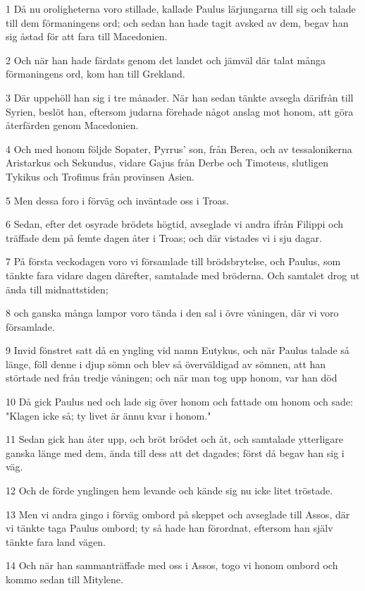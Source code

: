 \par 1 Då nu oroligheterna voro stillade, kallade Paulus lärjungarna till sig och talade till dem förmaningens ord; och sedan han hade tagit avsked av dem, begav han sig åstad för att fara till Macedonien.
\par 2 Och när han hade färdats genom det landet och jämväl där talat många förmaningens ord, kom han till Grekland.
\par 3 Där uppehöll han sig i tre månader. När han sedan tänkte avsegla därifrån till Syrien, beslöt han, eftersom judarna förehade något anslag mot honom, att göra återfärden genom Macedonien.
\par 4 Och med honom följde Sopater, Pyrrus' son, från Berea, och av tessalonikerna Aristarkus och Sekundus, vidare Gajus från Derbe och Timoteus, slutligen Tykikus och Trofimus från provinsen Asien.
\par 5 Men dessa foro i förväg och inväntade oss i Troas.
\par 6 Sedan, efter det osyrade brödets högtid, avseglade vi andra ifrån Filippi och träffade dem på femte dagen åter i Troas; och där vistades vi i sju dagar.
\par 7 På första veckodagen voro vi församlade till brödsbrytelse, och Paulus, som tänkte fara vidare dagen därefter, samtalade med bröderna. Och samtalet drog ut ända till midnattstiden;
\par 8 och ganska många lampor voro tända i den sal i övre våningen, där vi voro församlade.
\par 9 Invid fönstret satt då en yngling vid namn Eutykus, och när Paulus talade så länge, föll denne i djup sömn och blev så överväldigad av sömnen, att han störtade ned från tredje våningen; och när man tog upp honom, var han död
\par 10 Då gick Paulus ned och lade sig över honom och fattade om honom och sade: "Klagen icke så; ty livet är ännu kvar i honom."
\par 11 Sedan gick han åter upp, och bröt brödet och åt, och samtalade ytterligare ganska länge med dem, ända till dess att det dagades; först då begav han sig i väg.
\par 12 Och de förde ynglingen hem levande och kände sig nu icke litet tröstade.
\par 13 Men vi andra gingo i förväg ombord på skeppet och avseglade till Assos, där vi tänkte taga Paulus ombord; ty så hade han förordnat, eftersom han själv tänkte fara land vägen.
\par 14 Och när han sammanträffade med oss i Assos, togo vi honom ombord och kommo sedan till Mitylene.
